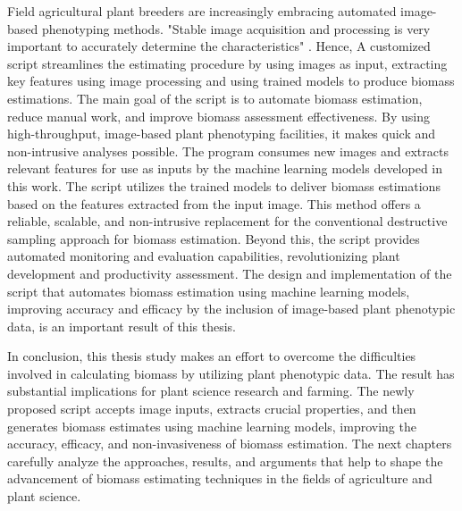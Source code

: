 \documentclass[a4paper,11pt]{report}%
\renewcommand{\\}{\vspace*{0.5\baselineskip} \newline}
\begin{document}
\noindent Field agricultural plant breeders are increasingly embracing automated image-based phenotyping methods. "Stable image acquisition and processing is very important to accurately determine the characteristics" \cite{8}. Hence, A customized script streamlines the estimating procedure by using images as input, extracting key features using image processing and using trained models to produce biomass estimations. The main goal of the script is to automate biomass estimation, reduce manual work, and improve biomass assessment effectiveness. By using high-throughput, image-based plant phenotyping facilities, it makes quick and non-intrusive analyses possible. The program consumes new images and extracts relevant features for use as inputs by the machine learning models developed in this work.
The script utilizes the trained models to deliver biomass estimations based on the features extracted from the input image. This method offers a reliable, scalable, and non-intrusive replacement for the conventional destructive sampling approach for biomass estimation. Beyond this, the script provides automated monitoring and evaluation capabilities, revolutionizing plant development and productivity assessment. The design and implementation of the script that automates biomass estimation using machine learning models, improving accuracy and efficacy by the inclusion of image-based plant phenotypic data, is an important result of this thesis.

\noindent In conclusion, this thesis study makes an effort to overcome the difficulties involved in calculating biomass by utilizing plant phenotypic data. The result has substantial implications for plant science research and farming. The newly proposed script accepts image inputs, extracts crucial properties, and then generates biomass estimates using machine learning models, improving the accuracy, efficacy, and non-invasiveness of biomass estimation. The next chapters carefully analyze the approaches, results, and arguments that help to shape the advancement of biomass estimating techniques in the fields of agriculture and plant science.
\end{document}
